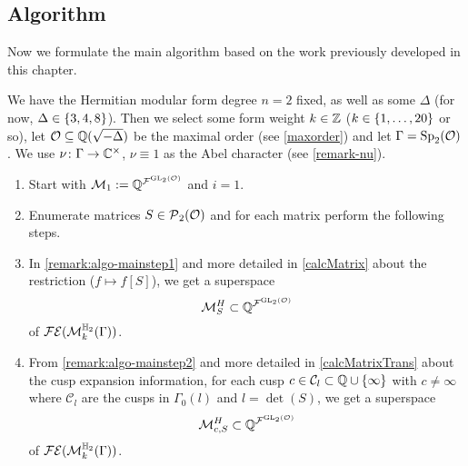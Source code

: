\subsection{Algorithm}

Now we formulate the main algorithm based on the work previously developed in this chapter.

\begin{algo}
\label{main-algo}
We have the Hermitian modular form degree $n = 2$ fixed, as well as some $\Delta$ (for now, $\Delta \in \Set{3,4,8}$). Then we select some form weight $k \in \mathbb{Z}$ ($k \in \Set{1,\dots,20}$ or so), let $\mathcal{O} \subseteq \mathbb{Q}(\sqrt{-\Delta})$ be the maximal order (see \cref{maxorder}) and let $\Gamma = \operatorname{Sp}_2(\mathcal{O})$. We use $\nu \colon \Gamma \rightarrow \mathbb{C}^\times$, $\nu \equiv 1$ as the Abel character (see \cref{remark-nu}).

\begin{enumerate}
\item
Start with $\mathcal{M}_1 := \mathbb{Q}^{{\mathcal{F}}^{\operatorname{GL}_2(\mathcal{O})}}$ and $i=1$.

\item\label{NextSStep} Enumerate matrices $S \in \operatorname{\mathcal{P}}_2(\mathcal{O})$ and for each matrix perform the following steps.


\item
In \cref{remark:algo-mainstep1} and more detailed in \cref{calcMatrix} about the restriction ($f \mapsto f[S]$), we get a superspace
\[ \mathcal{M}^H_S \subset \mathbb{Q}^{{\mathcal{F}}^{\operatorname{GL}_2(\mathcal{O})}} \]
of $\mathcal{FE}(\operatorname{\mathcal{M}}^{\mathbb{H}_{2}}_{k} (\Gamma))$.

\item
From \cref{remark:algo-mainstep2} and more detailed in \cref{calcMatrixTrans} about the cusp expansion information, for each cusp $c \in \mathcal{C}_l \subset {\Q \cup \Set{\infty}}$ with $c \ne \infty$ where $\mathcal{C}_l$ are the cusps in $\Gamma_0(l)$ and $l = \det(S)$, we get a superspace
\[ \mathcal{M}^H_{c,S} \subset \mathbb{Q}^{{\mathcal{F}}^{\operatorname{GL}_2(\mathcal{O})}} \]
of $\mathcal{FE}(\operatorname{\mathcal{M}}^{\mathbb{H}_{2}}_{k} (\Gamma))$.


\end{enumerate}
\end{algo}
